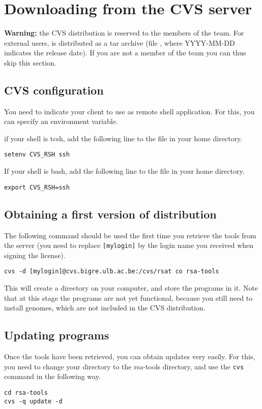 \section{Downloading \RSAT from the CVS server}

\textbf{Warning:} the CVS distribution is reserved to the members of
the \RSAT team. For external users, \RSAT is distributed as a tar
archive (file , where YYYY-MM-DD
indicates the release date). If you are not a member of the \RSAT team
you can thus skip this section.

\subsection{CVS configuration}

You need to indicate your  client to use 
as remote shell application. For this, you can specify an environment
variable.

if your shell is tcsh, add the following line to the 
file in your home directory.

\begin{lstlisting}
setenv CVS_RSH ssh
\end{lstlisting}


If your shell is bash, add the following line to the 
file in your home directory.

\begin{lstlisting}
export CVS_RSH=ssh
\end{lstlisting}

\subsection{Obtaining a first version of \RSAT distribution}

The following command should be used the first time you retrieve the
tools from the server (you need to replace \texttt{[mylogin]} by the
login name you received when signing the \RSAT license).

\begin{lstlisting}
cvs -d [mylogin]@cvs.bigre.ulb.ac.be:/cvs/rsat co rsa-tools
\end{lstlisting}


This will create a directory  on your computer, and
store the programs in it. Note that at this stage the programs are not
yet functional, because you still need to install genomes, which are
not included in the CVS distribution.

\subsection{Updating \RSAT programs}

Once the tools have been retrieved, you can obtain updates very
easily. For this, you need to change your directory to the rsa-tools
directory, and use the \texttt{cvs} command in the following way.

\begin{lstlisting}
cd rsa-tools
cvs -q update -d
\end{lstlisting}


